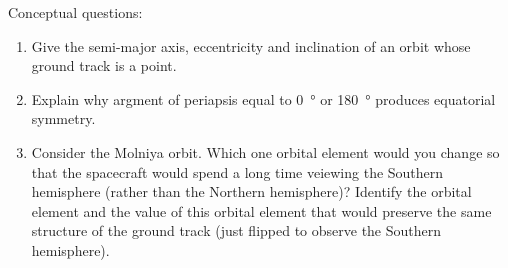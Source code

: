 \begin{hwkProblem}{1}{}

	Conceptual questions:
	\begin{enumerate}
		\item Give the semi-major axis, eccentricity and inclination of an orbit whose ground track is a point.
		\item Explain why argment of periapsis equal to \qty{0}{\degree} or \qty{180}{\degree} produces equatorial symmetry.
		\item Consider the Molniya orbit. Which one orbital element would you change so that the spacecraft would spend a long time veiewing the Southern hemisphere (rather than the Northern hemisphere)? Identify the orbital element and the value of this orbital element that would preserve the same structure of the ground track (just flipped to observe the Southern hemisphere).
	\end{enumerate}

	\hwkSol

\end{hwkProblem}
